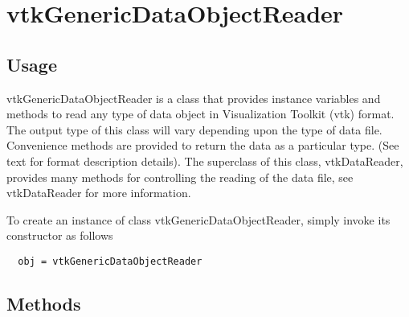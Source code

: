 \section{vtkGenericDataObjectReader}

\subsection{Usage}

 vtkGenericDataObjectReader is a class that provides instance variables and methods
 to read any type of data object in Visualization Toolkit (vtk) format.  The
 output type of this class will vary depending upon the type of data
 file. Convenience methods are provided to return the data as a particular
 type. (See text for format description details).
 The superclass of this class, vtkDataReader, provides many methods for
 controlling the reading of the data file, see vtkDataReader for more
 information.

To create an instance of class vtkGenericDataObjectReader, simply
invoke its constructor as follows
\begin{verbatim}
  obj = vtkGenericDataObjectReader
\end{verbatim}
\subsection{Methods}

